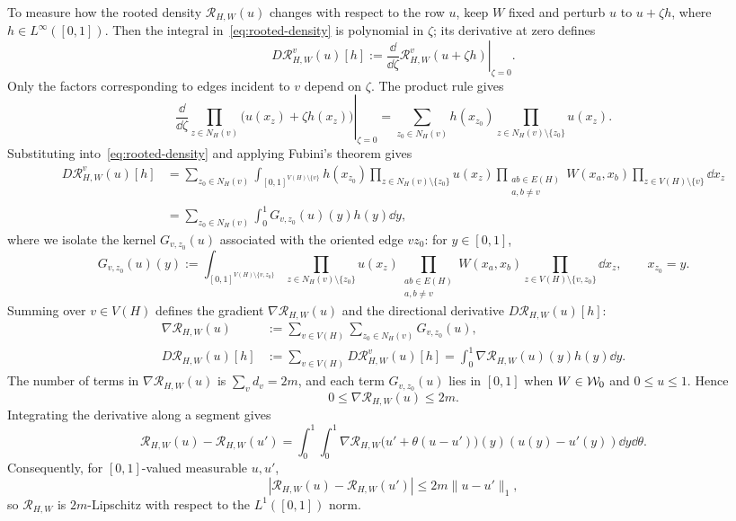 To measure how the rooted density $\mathcal R_{H,W}(u)$ changes with respect to the row $u$,
keep $W$ fixed and perturb $u$ to $u+\zeta h$, where $h\in L^\infty([0,1])$.
Then the integral in~\eqref{eq:rooted-density} is polynomial in $\zeta$;
its derivative at zero defines
\[
  D\mathcal R_{H,W}^{v}(u)[h]:=
  \left.\frac{\dd}{\dd\zeta}
    \mathcal R_{H,W}^{v}(u+\zeta h)\right|_{\zeta=0}.
\]
Only the factors corresponding to edges incident to $v$ depend on
$\zeta$.  The product rule gives
\[
  \left.\frac{\dd}{\dd\zeta}
    \prod_{z\in N_H(v)}\bigl(u(x_z)+\zeta h(x_z)\bigr)
  \right|_{\zeta=0}
  =\sum_{z_0\in N_H(v)}h(x_{z_0})
    \prod_{z\in N_H(v)\setminus\{z_0\}}u(x_z).
\]
Substituting into~\eqref{eq:rooted-density} and applying Fubini's theorem gives
\begin{align*}
  D\mathcal R_{H,W}^{v}(u)[h]
  &=\sum_{z_0\in N_H(v)}
    \int_{[0,1]^{V(H)\setminus\{v\}}}
    h(x_{z_0})\prod_{z\in N_H(v)\setminus\{z_0\}}u(x_z)
    \prod_{\substack{ab\in E(H)\\ a,b\ne v}}W(x_a,x_b)
    \prod_{z\in V(H)\setminus\{v\}}\dd x_z\\
  &=\sum_{z_0\in N_H(v)}\int_0^1G_{v,z_0}(u)(y)h(y)\dd y,
\end{align*}
where we isolate the kernel $G_{v,z_0}(u)$ associated with the oriented edge $vz_0$: for $y\in[0,1]$,
\begin{equation}\label{eq:rooted-gradient-kernel}
  G_{v,z_0}(u)(y):=\int_{[0,1]^{V(H)\setminus\{v,z_0\}}}\prod_{z\in N_H(v)\setminus\{z_0\}}u(x_z)
  \prod_{\substack{ab\in E(H)\\ a,b\ne v}}W(x_a,x_b)
  \prod_{z\in V(H)\setminus\{v,z_0\}}\dd x_z,
  \qquad x_{z_0}=y.
\end{equation}
Summing over $v\in V(H)$ defines the gradient $\nabla\mathcal R_{H,W}(u)$
and the directional derivative $D\mathcal R_{H,W}(u)[h]$:
\begin{align*}
  \nabla\mathcal R_{H,W}(u) &:=\sum_{v\in V(H)}\sum_{z_0\in N_H(v)}G_{v,z_0}(u), \\
  D\mathcal R_{H,W}(u)[h] &:=\sum_{v\in V(H)}D\mathcal R_{H,W}^{v}(u)[h]
  =\int_0^1\nabla\mathcal R_{H,W}(u)(y)h(y)\dd y.
\end{align*}
The number of terms in $\nabla\mathcal R_{H,W}(u)$ is $\sum_v d_v=2m$,
and each term $G_{v,z_0}(u)$ lies in $[0,1]$ when $W\in\mathcal W_0$
and $0\le u\le1$. Hence
\begin{equation}\label{eq:rooted-gradient-bound}
  0\le\nabla\mathcal R_{H,W}(u)\le2m.
\end{equation}
Integrating the derivative along a segment gives
\[
  \mathcal R_{H,W}(u)-\mathcal R_{H,W}(u')
  =\int_0^1\int_0^1
    \nabla\mathcal R_{H,W}\bigl(u'+\theta(u-u')\bigr)(y)
    (u(y)-u'(y))\dd y\dd\theta.
\]
Consequently, for $[0,1]$-valued measurable $u,u'$,
\begin{equation}\label{eq:rooted-lipschitz}
  |\mathcal R_{H,W}(u)-\mathcal R_{H,W}(u')|\le2m\|u-u'\|_1,
\end{equation}
so $\mathcal R_{H,W}$ is $2m$-Lipschitz with respect to the $L^1([0,1])$ norm.

